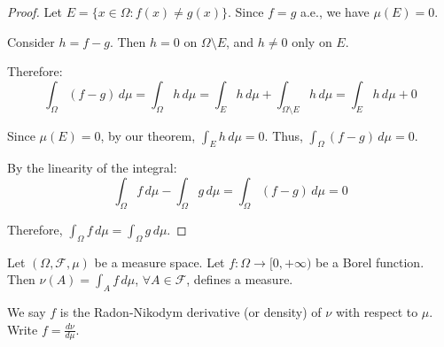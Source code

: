     \begin{proof}
    Let $E = \{x \in \Omega : f(x) \neq g(x)\}$. Since $f = g$ a.e., we have $\mu(E) = 0$.
    
    Consider $h = f - g$. Then $h = 0$ on $\Omega \setminus E$, and $h \neq 0$ only on $E$.
    
    Therefore:
    $$\int_\Omega (f - g) \, d\mu = \int_\Omega h \, d\mu = \int_E h \, d\mu + \int_{\Omega \setminus E} h \, d\mu = \int_E h \, d\mu + 0$$
    
    Since $\mu(E) = 0$, by our theorem, $\int_E h \, d\mu = 0$. Thus, $\int_\Omega (f - g) \, d\mu = 0$.
    
    By the linearity of the integral:
    $$\int_\Omega f \, d\mu - \int_\Omega g \, d\mu = \int_\Omega (f - g) \, d\mu = 0$$
    
    Therefore, $\int_\Omega f \, d\mu = \int_\Omega g \, d\mu$.
    \end{proof}
    \begin{proposition}[]{}
         Let $(\Omega, \mathcal{F}, \mu)$ be a measure space. Let $f: \Omega \to [0,+\infty)$ be a Borel function.\\
        
        Then $\nu(A) = \int_A f\,d\mu$, $\forall A \in \mathcal{F}$, defines a measure.
        \end{proposition}
        
        \begin{definition}[]{}
          We say $f$ is the Radon-Nikodym derivative (or density) of $\nu$ with respect to $\mu$. Write $f = \frac{d\nu}{d\mu}$.
        \end{definition}
        
